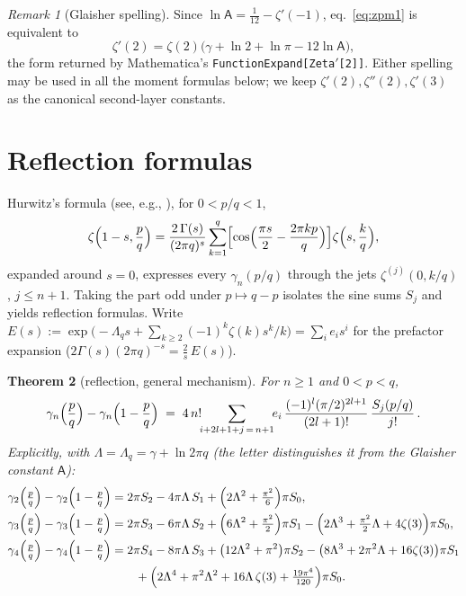 \documentclass[11pt]{article}
\newtheorem{theorem}{Theorem}[section]
\theoremstyle{remark}
\newtheorem{remark}[theorem]{Remark}
\newcommand{\Glaisher}{\mathsf{A}}
\newcommand{\lntwo}{\ln 2}
\newcommand{\lnpi}{\ln\pi}
\begin{document}
\begin{remark}[Glaisher spelling]\label{rem:glaisher}
Since $\ln\Glaisher=\tfrac1{12}-\zeta'(-1)$, eq.~\eqref{eq:zpm1} is
equivalent to
\[
\zeta'(2)=\zeta(2)\bigl(\gamma+\lntwo+\lnpi-12\ln\Glaisher\bigr),
\]
the form returned by Mathematica's
\texttt{FunctionExpand[Zeta$'$[2]]}. Either spelling may be used in all the
moment formulas below; we keep $\zeta'(2),\zeta''(2),\zeta'(3)$ as the
canonical second-layer constants.
\end{remark}

\section{Reflection formulas}\label{sec:reflection}

Hurwitz's formula (see, e.g., \cite[Ch.~12]{ApostolBook}), for $0<p/q<1$,
\[
\zeta\Bigl(1-s,\frac pq\Bigr)
=\frac{2\,\Gamma(s)}{(2\pi q)^{s}}
\sum_{k=1}^{q}\Bigl[\cos\Bigl(\frac{\pi s}{2}-\frac{2\pi kp}{q}\Bigr)\Bigr]
\zeta\Bigl(s,\frac kq\Bigr),
\]
expanded around $s=0$, expresses every $\gamma_n(p/q)$ through the jets
$\zeta^{(j)}(0,k/q)$, $j\le n+1$. Taking the part odd under
$p\mapsto q-p$ isolates the sine sums $S_j$ and yields reflection formulas.
Write
$E(s):=\exp\bigl(-\Lambda_qs+\sum_{k\ge2}(-1)^k\zeta(k)s^k/k\bigr)=\sum_i e_is^i$
for the prefactor expansion
($2\Gamma(s)(2\pi q)^{-s}=\tfrac2s\,E(s)$).

\begin{theorem}[reflection, general mechanism]\label{thm:reflgen}
For $n\ge1$ and $0<p<q$,
\[
\gamma_n\Bigl(\frac pq\Bigr)-\gamma_n\Bigl(1-\frac pq\Bigr)
\;=\;4\,n!\!\!\sum_{i+2l+1+j\,=\,n+1}\!\! e_i\,
\frac{(-1)^l(\pi/2)^{2l+1}}{(2l+1)!}\,\frac{S_j(p/q)}{j!}\,.
\]
Explicitly, with $\Lambda=\Lambda_q=\gamma+\ln 2\pi q$ (the letter
distinguishes it from the Glaisher constant $\Glaisher$):
\begin{align}
\gamma_2\Bigl(\tfrac pq\Bigr)-\gamma_2\Bigl(1-\tfrac pq\Bigr)
&=2\pi S_2-4\pi \Lambda\,S_1+\Bigl(2\Lambda^2+\tfrac{\pi^2}{6}\Bigr)\pi S_0,
\label{eq:refl2}\\
\gamma_3\Bigl(\tfrac pq\Bigr)-\gamma_3\Bigl(1-\tfrac pq\Bigr)
&=2\pi S_3-6\pi \Lambda\,S_2+\Bigl(6\Lambda^2+\tfrac{\pi^2}{2}\Bigr)\pi S_1
-\Bigl(2\Lambda^3+\tfrac{\pi^2}{2}\Lambda+4\zeta(3)\Bigr)\pi S_0,
\label{eq:refl3}\\
\gamma_4\Bigl(\tfrac pq\Bigr)-\gamma_4\Bigl(1-\tfrac pq\Bigr)
&=2\pi S_4-8\pi \Lambda\,S_3+\bigl(12\Lambda^2+\pi^2\bigr)\pi S_2
-\bigl(8\Lambda^3+2\pi^2\Lambda+16\zeta(3)\bigr)\pi S_1\notag\\
&\qquad
+\Bigl(2\Lambda^4+\pi^2\Lambda^2+16\Lambda\,\zeta(3)+\tfrac{19\pi^4}{120}\Bigr)\pi S_0 .
\label{eq:refl4}
\end{align}
\end{theorem}
\end{document}
